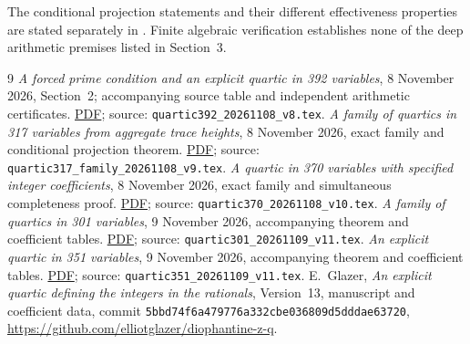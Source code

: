 \documentclass[11pt,a4paper]{article}
\theoremstyle{remark}\newtheorem{remark}[theorem]{Remark}
\begin{document}
The conditional projection statements and their different effectiveness
properties are stated separately in \cite{Family301,Explicit351}.
Finite algebraic verification establishes none of the deep arithmetic
premises listed in Section~3.

\begin{thebibliography}{9}
\emph{A forced prime condition and an explicit quartic in 392 variables},
8 November 2026, Section~2; accompanying source table and independent
arithmetic certificates.
\href{../quartic/quartic392_20261108_v8.pdf}{PDF}; source: \nolinkurl{quartic392_20261108_v8.tex}.
\emph{A family of quartics in 317 variables from aggregate trace heights},
8 November 2026, exact family and conditional projection theorem.
\href{../quartic_existence/quartic317_family_20261108_v9.pdf}{PDF}; source: \nolinkurl{quartic317_family_20261108_v9.tex}.
\emph{A quartic in 370 variables with specified integer coefficients},
8 November 2026, exact family and simultaneous completeness proof.
\href{../quartic/quartic370_20261108_v10.pdf}{PDF}; source: \nolinkurl{quartic370_20261108_v10.tex}.
\emph{A family of quartics in 301 variables}, 9 November 2026,
accompanying theorem and coefficient tables.
\href{../quartic_existence/quartic301_20261109_v11.pdf}{PDF}; source: \nolinkurl{quartic301_20261109_v11.tex}.
\emph{An explicit quartic in 351 variables}, 9 November 2026,
accompanying theorem and coefficient tables.
\href{../quartic/quartic351_20261109_v11.pdf}{PDF}; source: \nolinkurl{quartic351_20261109_v11.tex}.
E.~Glazer, \emph{An explicit quartic defining the integers in the rationals},
Version~13, manuscript and coefficient data, commit
\nolinkurl{5bbd74f6a479776a332cbe036809d5dddae63720},
\url{https://github.com/elliotglazer/diophantine-z-q}.
\end{thebibliography}
\end{document}
